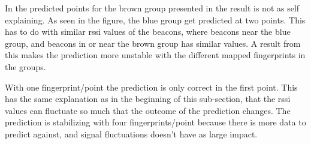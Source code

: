 
In the predicted points for the brown group presented in  the result is not as self explaining.
As seen in the figure, the blue group get predicted at two points.
This has to do with similar \acrshort{rssi} values of the beacons, where beacons near the blue group, and beacons in or near the brown group has similar values.
A result from this makes the prediction more unstable with the different mapped fingerprints in the groups.

\bigskip

With one fingerprint/point the prediction is only correct in the first point.
This has the same explanation as in the beginning of this sub-section, that the \acrshort{rssi} values can fluctuate so much that the outcome of the prediction changes.
The prediction is stabilizing with four fingerprints/point because there is more data to predict against, and signal fluctuations doesn't have as large impact.
